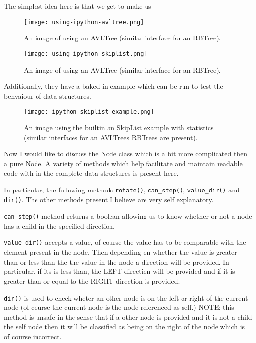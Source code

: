 \documentclass[article]{uom-coursework}
\begin{document}
The simplest idea here is that we get to make us

\begin{figure}[H]
\centering
\texttt{[image: using-ipython-avltree.png]}
\caption{An image of using an AVLTree (similar interface for an RBTree).}
\label{fig:test9}
\end{figure}

\begin{figure}[H]
\centering
\texttt{[image: using-ipython-skiplist.png]}
\caption{An image of using an AVLTree (similar interface for an RBTree).}
\label{fig:test9}
\end{figure}

Additionally, they have a baked in example which
can be run to test the behvaiour of data structures.

\begin{figure}[H]
\centering
\texttt{[image: ipython-skiplist-example.png]}
\caption{An image using the builtin an SkipList example with statistics (similar interfaces for an AVLTrees RBTrees are present).}
\label{fig:test9}
\end{figure}

Now I would like to discuss the Node class which is
a bit more complicated then a pure Node. A
variety of methods which help facilitate 
and maintain readable code with in the
complete data structures is present
here.

In particular, the following methods
\texttt{rotate()}, \texttt{can\_step()},
\texttt{value_dir()} and \texttt{dir()}.
The other methods present I believe are
very self explanatory.

\texttt{can\_step()} method
returns a boolean allowing us to know whether or not
a node has a child in the specified direction.

\texttt{value\_dir()} accepts a value, of course the value has
to be comparable with the element present in the node. Then
depending on whether the value is greater than or less than the
the value in the node a direction will be provided. In
particular, if its is less than, the LEFT direction will be
provided and if it is greater than or equal to the RIGHT
direction is provided.

\texttt{dir()} is used to check wheter an other
node is on the left or right of the current node
(of course the current node is the node referenced
as self.) NOTE: this method is unsafe
in the sense that if a other node
is provided and it is not a child the
self node then it will be classified as being
on the right of the node which is of course
incorrect.
\end{document}
